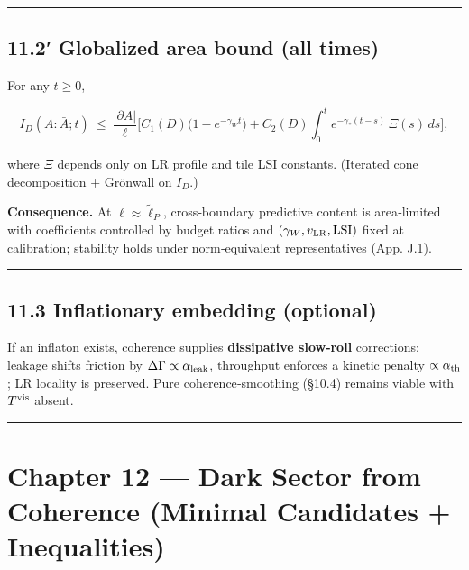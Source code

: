 \documentclass[
]{article}
\numberwithin{equation}{section}
\begin{document}
\begin{center}\rule{0.5\linewidth}{0.5pt}\end{center}

\hypertarget{globalized-area-bound-all-times}{%
\subsection{11.2′ Globalized area bound (all
times)}\label{globalized-area-bound-all-times}}

For any \(t\ge0\),

\[
I_D(A{:}\bar A;t)\ \le\ \frac{|\partial A|}{\ell}\Big[C_1(D)\big(1-e^{-\gamma_W t}\big)+C_2(D)\!\int_0^t e^{-\gamma_* (t-s)}\,\Xi(s)\,ds\Big],
\]

where \(\Xi\) depends only on LR profile and tile LSI constants.
(Iterated cone decomposition + Grönwall on \(I_D\).)

\textbf{Consequence.} At \(\ell\approx\tilde\ell_P\), cross‑boundary
predictive content is area‑limited with coefficients controlled by
budget ratios and \((\gamma_W,v_{\rm LR},\text{LSI})\) fixed at
calibration; stability holds under norm‑equivalent representatives (App.
J.1).

\begin{center}\rule{0.5\linewidth}{0.5pt}\end{center}

\hypertarget{inflationary-embedding-optional}{%
\subsection{11.3 Inflationary embedding
(optional)}\label{inflationary-embedding-optional}}

If an inflaton exists, coherence supplies \textbf{dissipative slow‑roll}
corrections: leakage shifts friction by
\(\Delta\Gamma\propto\alpha_{\rm leak}\), throughput enforces a kinetic
penalty \(\propto\alpha_{\rm th}\); LR locality is preserved. Pure
coherence‑smoothing (§10.4) remains viable with \(T^{\rm vis}\) absent.

\begin{center}\rule{0.5\linewidth}{0.5pt}\end{center}

\hypertarget{chapter-12-dark-sector-from-coherence-minimal-candidates-inequalities}{%
\section{Chapter 12 --- Dark Sector from Coherence (Minimal Candidates +
Inequalities)}\label{chapter-12-dark-sector-from-coherence-minimal-candidates-inequalities}}
\end{document}
